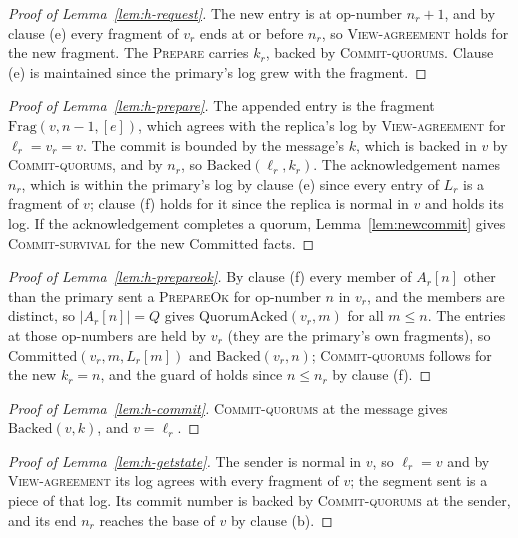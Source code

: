 \documentclass[11pt,a4paper]{article}
\theoremstyle{plain}
\theoremstyle{definition}
\theoremstyle{remark}
\newcommand{\msg}[1]{\textsc{#1}}
\newcommand{\Frag}{\mathrm{Frag}}
\newcommand{\QuorumAcked}{\mathrm{QuorumAcked}}
\newcommand{\Committed}{\mathrm{Committed}}
\newcommand{\Backed}{\mathrm{Backed}}
\newcommand{\OneLog}{\textsc{View-agreement}}
\newcommand{\CommitsBacked}{\textsc{Commit-quorums}}
\newcommand{\Survival}{\textsc{Commit-survival}}
\begin{document}
\begin{proof}[Proof of Lemma~\ref{lem:h-request}]
The new entry is at op-number $n_r + 1$, and by clause (e) every
fragment of $v_r$ ends at or before $n_r$, so \OneLog{} holds for the new
fragment. The \msg{Prepare} carries $k_r$, backed by \CommitsBacked.
Clause (e) is maintained since the primary's log grew with the fragment.
\end{proof}

\begin{proof}[Proof of Lemma~\ref{lem:h-prepare}]
The appended entry is the fragment $\Frag(v, n-1, [e])$, which agrees
with the replica's log by \OneLog{} for $\ell_r = v_r = v$. The commit is
bounded by the message's $k$, which is backed in $v$ by \CommitsBacked,
and by $n_r$, so $\Backed(\ell_r, k_r)$. The acknowledgement names
$n_r$, which is within the primary's log by clause (e) since every entry
of $L_r$ is a fragment of $v$; clause (f) holds for it since the replica
is normal in $v$ and holds its log. If the acknowledgement completes a
quorum, Lemma~\ref{lem:newcommit} gives \Survival{} for the new
$\Committed$ facts.
\end{proof}

\begin{proof}[Proof of Lemma~\ref{lem:h-prepareok}]
By clause (f) every member of $A_r[n]$ other than the primary sent a
\msg{PrepareOk} for op-number $n$ in $v_r$, and the members are distinct,
so $|A_r[n]| = Q$ gives $\QuorumAcked(v_r, m)$ for all $m \le n$. The
entries at those op-numbers are held by $v_r$ (they are the primary's
own fragments), so $\Committed(v_r, m, L_r[m])$ and $\Backed(v_r, n)$;
\CommitsBacked{} follows for the new $k_r = n$, and the guard of
 holds since $n \le n_r$ by clause (f).
\end{proof}

\begin{proof}[Proof of Lemma~\ref{lem:h-commit}]
\CommitsBacked{} at the message gives $\Backed(v, k)$, and $v = \ell_r$.
\end{proof}

\begin{proof}[Proof of Lemma~\ref{lem:h-getstate}]
The sender is normal in $v$, so $\ell_r = v$ and by \OneLog{} its log
agrees with every fragment of $v$; the segment sent is a piece of that
log. Its commit number is backed by \CommitsBacked{} at the sender, and
its end $n_r$ reaches the base of $v$ by clause (b).
\end{proof}
\end{document}
